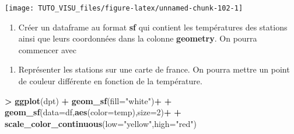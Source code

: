 \documentclass[]{book}
\newenvironment{Shaded}{\begin{snugshade}}{\end{snugshade}}
\newcommand{\DataTypeTok}[1]{\textcolor[rgb]{0.13,0.29,0.53}{#1}}
\newcommand{\DecValTok}[1]{\textcolor[rgb]{0.00,0.00,0.81}{#1}}
\newcommand{\KeywordTok}[1]{\textcolor[rgb]{0.13,0.29,0.53}{\textbf{#1}}}
\newcommand{\NormalTok}[1]{#1}
\newcommand{\OperatorTok}[1]{\textcolor[rgb]{0.81,0.36,0.00}{\textbf{#1}}}
\newcommand{\StringTok}[1]{\textcolor[rgb]{0.31,0.60,0.02}{#1}}
\providecommand{\tightlist}{%
  \setlength{\itemsep}{0pt}\setlength{\parskip}{0pt}}
\theoremstyle{definition}
\theoremstyle{definition}
\theoremstyle{definition}
\theoremstyle{remark}
\begin{document}
\begin{center}\texttt{[image: TUTO\_VISU\_files/figure-latex/unnamed-chunk-102-1]} \end{center}

\begin{enumerate}
\def\labelenumi{\arabic{enumi}.}
\setcounter{enumi}{2}
\tightlist
\item
  Créer un dataframe au format \textbf{sf} qui contient les températures des stations ainsi que leurs coordonnées dans la colonne \textbf{geometry}. On pourra commencer avec
\end{enumerate}

\begin{Shaded}
\end{Shaded}

\begin{Shaded}
\end{Shaded}

\begin{enumerate}
\def\labelenumi{\arabic{enumi}.}
\setcounter{enumi}{3}
\tightlist
\item
  Représenter les stations sur une carte de france. On pourra mettre un point de couleur différente en fonction de la température.
\end{enumerate}

\begin{Shaded}
\begin{Highlighting}[]
\OperatorTok{>}\StringTok{ }\KeywordTok{ggplot}\NormalTok{(dpt) }\OperatorTok{+}\StringTok{ }\KeywordTok{geom_sf}\NormalTok{(}\DataTypeTok{fill=}\StringTok{"white"}\NormalTok{)}\OperatorTok{+}
\OperatorTok{+}\StringTok{   }\KeywordTok{geom_sf}\NormalTok{(}\DataTypeTok{data=}\NormalTok{df,}\KeywordTok{aes}\NormalTok{(}\DataTypeTok{color=}\NormalTok{temp),}\DataTypeTok{size=}\DecValTok{2}\NormalTok{)}\OperatorTok{+}
\OperatorTok{+}\StringTok{   }\KeywordTok{scale_color_continuous}\NormalTok{(}\DataTypeTok{low=}\StringTok{"yellow"}\NormalTok{,}\DataTypeTok{high=}\StringTok{"red"}\NormalTok{)}
\end{Highlighting}
\end{Shaded}
\end{document}
